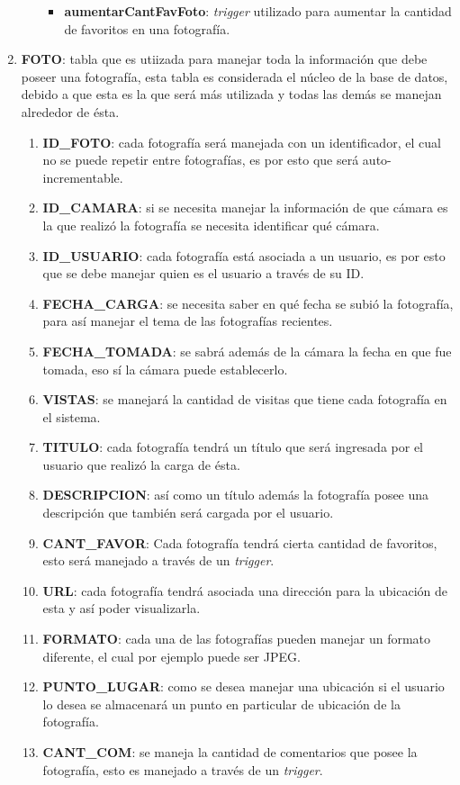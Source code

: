 \documentclass{memoria}
\begin{document}
\begin{enumerate}
\begin{enumerate}
		\begin{itemize}
		\item \textbf{aumentarCantFavFoto}: \textsl{trigger} utilizado para aumentar la cantidad de favoritos en una fotografía.
		\end{itemize}
	\end{enumerate}

\item \textbf{FOTO}: tabla que es utiizada para manejar toda la información que debe poseer una fotografía, esta tabla es considerada el núcleo de la base de datos, debido a que esta es la que será más utilizada y todas las demás se manejan alrededor de ésta.

	\begin{enumerate}
	\item \textbf{ID\_FOTO}: cada fotografía será manejada con un identificador, el cual no se puede repetir entre fotografías, es por esto que será auto-incrementable.
	\item \textbf{ID\_CAMARA}: si se necesita manejar la información de que cámara es la que realizó la fotografía se necesita identificar qué cámara.
	\item \textbf{ID\_USUARIO}: cada fotografía está asociada a un usuario, es por esto que se debe manejar quien es el usuario a través de su ID.
	\item \textbf{FECHA\_CARGA}: se necesita saber en qué fecha se subió la fotografía, para así manejar el tema de las fotografías recientes.
	\item \textbf{FECHA\_TOMADA}: se sabrá además de la cámara la fecha en que fue tomada, eso sí  la cámara puede establecerlo.
	\item \textbf{VISTAS}: se manejará la cantidad de visitas que tiene cada fotografía en el sistema.
	\item \textbf{TITULO}: cada fotografía tendrá un título que será ingresada por el usuario que realizó la carga de ésta.
	\item \textbf{DESCRIPCION}: así como un título además la fotografía posee una descripción que también será cargada por el usuario.
	\item \textbf{CANT\_FAVOR}: Cada fotografía tendrá cierta cantidad de favoritos, esto será manejado a través de un \textsl{trigger}.
	\item \textbf{URL}: cada fotografía tendrá asociada una dirección para la ubicación de esta y así poder visualizarla.
	\item \textbf{FORMATO}: cada una de las fotografías pueden manejar un formato diferente, el cual por ejemplo puede ser JPEG.
	\item \textbf{PUNTO\_LUGAR}: como se desea manejar una ubicación si el usuario lo desea se almacenará un punto en particular de ubicación de la fotografía.
	\item \textbf{CANT\_COM}: se maneja la cantidad de comentarios que posee la fotografía, esto es manejado a través de un \textsl{trigger}.
	

\end{enumerate}
\end{enumerate}
\end{document}
